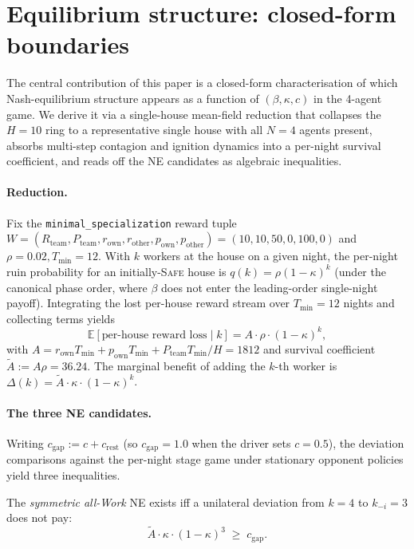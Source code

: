 \documentclass{anvil-paper}
\begin{document}
\section{Equilibrium structure: closed-form boundaries}
\label{sec:ne}

The central contribution of this paper is a closed-form characterisation of
which Nash-equilibrium structure appears as a function of $(\beta,\kappa,c)$
in the 4-agent game. We derive it via a single-house mean-field reduction
that collapses the $H{=}10$ ring to a representative single house with all
$N{=}4$ agents present, absorbs multi-step contagion and ignition dynamics
into a per-night survival coefficient, and reads off the NE candidates as
algebraic inequalities.

\paragraph{Reduction.}
Fix the \texttt{minimal\_specialization} reward tuple
$W{=}(R_{\text{team}},P_{\text{team}},r_{\text{own}},r_{\text{other}},
p_{\text{own}},p_{\text{other}}){=}(10,10,50,0,100,0)$ and $\rho{=}0.02,
T_{\min}{=}12$. With $k$ workers at the house on a given night, the per-night
ruin probability for an initially-\textsc{Safe} house is
$q(k){=}\rho(1-\kappa)^k$ (under the canonical phase order, where $\beta$
does not enter the leading-order single-night payoff). Integrating the lost
per-house reward stream over $T_{\min}{=}12$ nights and collecting terms
yields
\[
  \mathbb{E}[\text{per-house reward loss}\mid k] = A\cdot\rho\cdot(1-\kappa)^k,
\]
with $A{=}r_{\text{own}}T_{\min}+p_{\text{own}}T_{\min}+P_{\text{team}}
T_{\min}/H{=}1812$ and survival coefficient
$\tilde A{:=}A\rho{=}36.24$. The marginal benefit of adding the $k$-th
worker is $\Delta(k){=}\tilde A\cdot\kappa\cdot(1-\kappa)^k$.

\paragraph{The three NE candidates.}
Writing $c_{\text{gap}}{:=}c+c_{\text{rest}}$ (so $c_{\text{gap}}{=}1.0$ when
the driver sets $c{=}0.5$), the deviation comparisons against the per-night
stage game under stationary opponent policies yield three inequalities.

The \emph{symmetric all-Work} NE exists iff a unilateral deviation from
$k{=}4$ to $k_{-i}{=}3$ does not pay:
\begin{equation}
  \tilde A\cdot\kappa\cdot(1-\kappa)^{3}\;\geq\;c_{\text{gap}}.
  \tag{S}\label{eq:S}
\end{equation}
\end{document}

